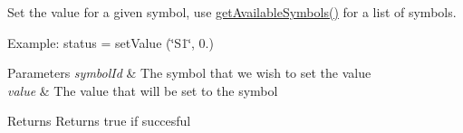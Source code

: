 \-Set the value for a given symbol, use \hyperlink{group__state_gae5b437645cc3a7dc3e6b4423f9ac8046}{get\-Available\-Symbols()} for a list of symbols. 

\-Example\-: status = set\-Value (\char`\"{}\-S1\char`\"{}, 0.)


\begin{DoxyParams}{\-Parameters}
{\em symbol\-Id} & \-The symbol that we wish to set the value \\
\hline
{\em value} & \-The value that will be set to the symbol \\
\hline
\end{DoxyParams}
\begin{DoxyReturn}{\-Returns}
\-Returns true if succesful 
\end{DoxyReturn}
